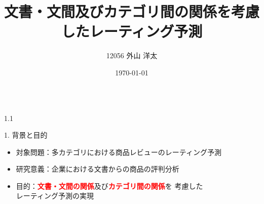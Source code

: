 \documentclass[unicode,10pt]{beamer}
\title{文書・文間及びカテゴリ間の関係を考慮したレーティング予測}
\institute{知能数理研究室}
\author{12056 外山 洋太}
\date{\today}
\newlength{\mycolumnwidth}
\newcommand{\fire}[1]{\textcolor{red}{\textbf{#1}}}
\begin{document}
\begin{frame}

\begin{columns}[onlytextwidth,t]
  \begin{column}{1.1\mycolumnwidth}
    \begin{block}{1. 背景と目的}
      \begin{itemize}
        \item 対象問題：多カテゴリにおける商品レビューのレーティング予測
        \item 研究意義：企業における文書からの商品の評判分析
        \item 目的：\fire{文書・文間の関係}及び\fire{カテゴリ間の関係}を
                    考慮した\\レーティング予測の実現
      \end{itemize}
    \end{block}
  \end{column}
\end{columns}
\end{frame}
\end{document}
